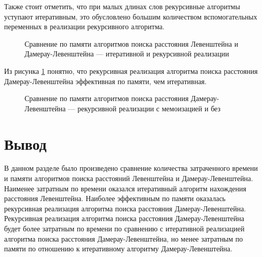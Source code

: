 Также стоит отметить, что при малых длинах слов рекурсивные алгоритмы уступают итеративным, это обусловлено большим 
количеством вспомогательных переменных в реализации рекурсивного алгоритма.

\begin{figure}[H]
	\centering
	
	\caption{Сравнение по памяти алгоритмов поиска расстояния Левенштейна и Дамерау-Левенштейна --- итеративной и рекурсивной реализации}
	\label{plt:memory_mat_rec}
\end{figure}

Из рисунка \ref{plt:memory_mat_rec} понятно, что рекурсивная реализация алгоритма поиска расстояния Дамерау-Левенштейна эффективная по памяти, чем итеративная.

\begin{figure}[H]
	\centering
	
	\caption{Сравнение по памяти алгоритмов поиска расстояния Дамерау-Левенштейна --- рекурсивной реализации с мемоизацией и без}
	\label{plt:memory_rec}
\end{figure}

\clearpage

\section{Вывод}

В данном разделе было произведено сравнение количества затраченного времени и памяти алгоритмов поиска расстояний Левенштейна и Дамерау-Левенштейна. Наименее затратным по времени оказался итеративный алгоритм нахождения расстояния Левенштейна.
Наиболее эффективным по памяти оказалась рекурсивная реализация алгоритма поиска расстояния Дамерау-Левенштейна.
Рекурсивная реализация алгоритма поиска расстояния Дамерау-Левенштейна будет более затратным по времени по сравнению с итеративной реализацией алгоритма поиска расстояния Дамерау-Левенштейна, но менее затратным по памяти по отношению к итеративному алгоритму Дамерау-Левенштейна.
